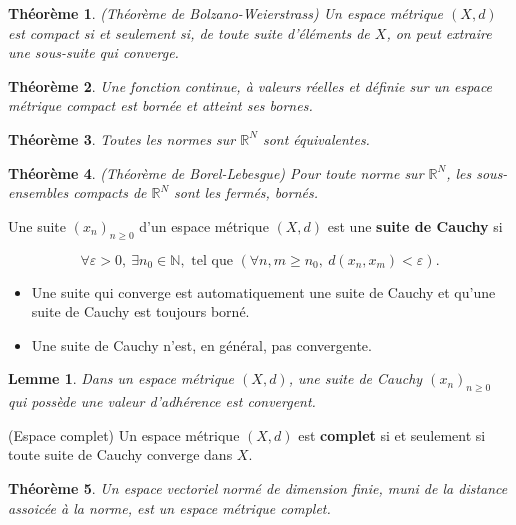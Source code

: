 \documentclass[10pt,a4paper,oneside]{article}
\newtheorem{theoreme}{Théorème}
\newtheorem{lemme}{Lemme}
\newenvironment{definition}[1][Definition]{\begin{trivlist}
\item[\hskip \labelsep {\bfseries #1}]}{\end{trivlist}}
\begin{document}
\begin{theoreme}
(Théorème de Bolzano-Weierstrass)
Un espace métrique $(X,d)$ est compact si et seulement si, de toute suite d'éléments de $X$, on peut extraire une sous-suite qui converge.
\end{theoreme}

\begin{theoreme}
Une fonction continue, à valeurs réelles et définie sur un espace métrique compact est bornée et atteint ses bornes.
\end{theoreme}

\begin{theoreme}
Toutes les normes sur $\mathbb{R}^N$ sont équivalentes.
\end{theoreme}

\begin{theoreme}
(Théorème de Borel-Lebesgue)
Pour toute norme sur $\mathbb{R}^N$, les sous-ensembles compacts de $\mathbb{R}^N$ sont les fermés, bornés.
\end{theoreme}

\begin{definition}
Une suite $(x_n)_{n \geq 0}$ d'un espace métrique $(X,d)$ est une \textbf{suite de Cauchy} si

\[ \forall \varepsilon > 0,\ \exists n_0 \in \mathbb{N}, \text{ tel que } (\forall n,m \geq n_0,\ d(x_n,x_m) < \varepsilon). \]
\end{definition}

\begin{itemize}
\item
Une suite qui converge est automatiquement une suite de Cauchy et qu'une suite de Cauchy est toujours borné.
\item
Une suite de Cauchy n'est, en général, pas convergente.
\end{itemize}

\begin{lemme}
Dans un espace métrique $(X,d)$, une suite de Cauchy $(x_n)_{n \geq 0}$ qui possède une valeur d'adhérence est convergent.
\end{lemme}

\begin{definition}
(Espace complet)
Un espace métrique $(X,d)$ est \textbf{complet} si et seulement si toute suite de Cauchy converge dans $X$.
\end{definition}

\begin{theoreme}
Un espace vectoriel normé de dimension finie, muni de la distance assoicée à la norme, est un espace métrique complet.
\end{theoreme}
\end{document}
